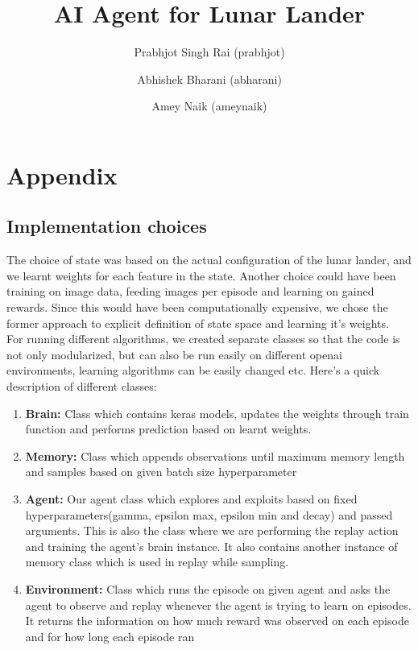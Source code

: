 \documentclass{article}
\begin{document}
\pagestyle{empty} 

\title{\textbf{ AI Agent for Lunar Lander}}

\author{Prabhjot Singh Rai  (prabhjot) \\ 
\and Abhishek Bharani (abharani) \\
\and Amey Naik (ameynaik)
}


\maketitle












\section{Appendix}
\subsection{Implementation choices}

The choice of state was based on the actual configuration of the lunar lander, and we learnt weights for each feature in the state. Another choice could have been training on image data, feeding images per episode and learning on gained rewards. Since this would have been computationally expensive, we chose the former approach to explicit definition of state space and learning it's weights. \\

For running different algorithms, we created separate classes so that the code is not only modularized, but can also be run easily on different openai environments, learning algorithms can be easily changed etc. Here's a quick description of different classes:

\begin{enumerate}
\item \textbf{Brain:} Class which contains keras models, updates the weights through train function and performs prediction based on learnt weights. 
\item \textbf{Memory:} Class which appends observations until maximum memory length and samples based on given batch size hyperparameter
\item \textbf{Agent:} Our agent class which explores and exploits based on fixed hyperparameters(gamma, epsilon max, epsilon min and decay) and passed arguments. This is also the class where we are performing the replay action and training the agent's brain instance. It also contains another instance of memory class which is used in replay while sampling.
\item \textbf{Environment:} Class which runs the episode on given agent and asks the agent to observe and replay whenever the agent is trying to learn on episodes. It returns the information on how much reward was observed on each episode and for how long each episode ran
\end{enumerate}
\end{document}
